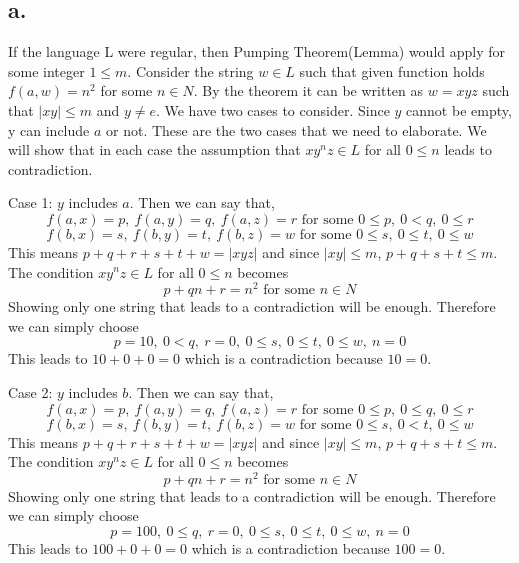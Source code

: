 \documentclass[12pt]{article}
\begin{document}
\subsection*{a.}
If the language L were regular, then Pumping Theorem(Lemma) would apply for some integer $1\leq m$. Consider the string $w\in L$ such that given function holds $f(a,w)=n^2$ for some $n\in N$. By the theorem it can be written as $w=xyz$ such that $|xy|\leq m$ and $y\neq e$. We have two cases to consider. Since $y$ cannot be empty, y can include $a$ or not. These are the two cases that we need to elaborate. We will show that in each case the assumption that $xy^nz\in L$ for all $0\leq n$ leads to contradiction. \par
Case 1: $y$ includes $a$. Then we can say that, \\
$$f(a,x)=p,\ f(a,y)=q,\ f(a,z)=r \text{ for some }0\leq p,\ 0<q,\ 0\leq r$$
$$f(b,x)=s,\ f(b,y)=t,\ f(b,z)=w \text{ for some }0\leq s,\ 0\leq t,\ 0\leq w$$
This means $p+q+r+s+t+w=|xyz|$ and since $|xy|\leq m$, $p+q+s+t\leq m$. \\
The condition $xy^nz\in L$ for all $0\leq n$ becomes 
$$p+qn+r=n^2 \text{ for some } n\in N$$
Showing only one string that leads to a contradiction will be enough. Therefore we can simply choose 
$$p=10,\ 0<q,\ r=0,\ 0\leq s,\ 0\leq t,\ 0\leq w,\ n=0$$ 
This leads to $10+0+0=0$ which is a contradiction because $10=0$. \\ \par
Case 2: $y$ includes $b$. Then we can say that, \\
$$f(a,x)=p,\ f(a,y)=q,\ f(a,z)=r \text{ for some }0\leq p,\ 0\leq q,\ 0\leq r$$
$$f(b,x)=s,\ f(b,y)=t,\ f(b,z)=w \text{ for some }0\leq s,\ 0<t,\ 0\leq w$$
This means $p+q+r+s+t+w=|xyz|$ and since $|xy|\leq m$, $p+q+s+t\leq m$. \\
The condition $xy^nz\in L$ for all $0\leq n$ becomes 
$$p+qn+r=n^2 \text{ for some } n\in N$$
Showing only one string that leads to a contradiction will be enough. Therefore we can simply choose 
$$p=100,\ 0\leq q,\ r=0,\ 0\leq s,\ 0\leq t,\ 0\leq w,\ n=0$$
This leads to $100+0+0=0$ which is a contradiction because $100=0$. 
\end{document}
